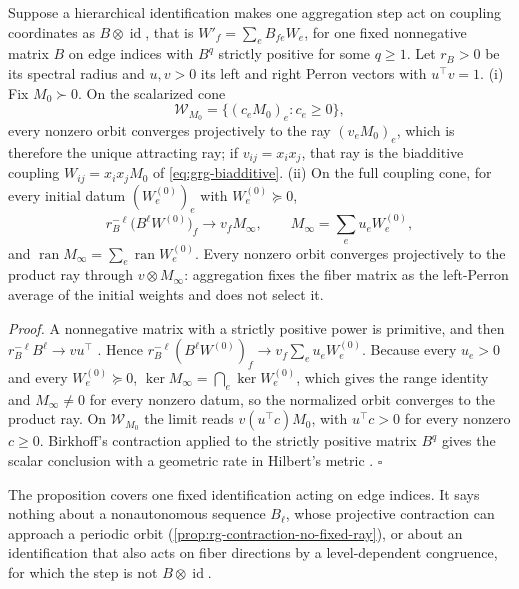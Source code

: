 Suppose a hierarchical identification makes one aggregation step act on
coupling coordinates as \(B\otimes\operatorname{id}\), that is
\(W'_f=\sum_eB_{fe}W_e\), for one fixed nonnegative matrix \(B\) on edge indices
with \(B^q\) strictly positive for some \(q\geq1\). Let \(r_B>0\) be its spectral
radius and \(u,v>0\) its left and right Perron vectors with \(u^\top v=1\).
(i) Fix \(M_0\succ0\). On the scalarized cone
\begin{equation}
\mathcal W_{M_0}=\{(c_eM_0)_e:c_e\geq0\},
\label{eq:grg-scalarized-cone}
\end{equation}
every nonzero orbit converges projectively to the ray \((v_eM_0)_e\), which is
therefore the unique attracting ray; if \(v_{ij}=x_ix_j\), that ray is the
biadditive coupling \(W_{ij}=x_ix_jM_0\) of \eqref{eq:grg-biadditive}.
(ii) On the full coupling cone, for every initial datum \((W_e^{(0)})_e\) with
\(W_e^{(0)}\succeq0\),
\begin{equation}
r_B^{-\ell}\bigl(B^\ell W^{(0)}\bigr)_f\longrightarrow v_fM_\infty,
\qquad
M_\infty=\sum_eu_eW_e^{(0)},
\label{eq:grg-full-cone-perron-limit}
\end{equation}
and \(\operatorname{ran}M_\infty=\sum_e\operatorname{ran}W_e^{(0)}\). Every
nonzero orbit converges projectively to the product ray through
\(v\otimes M_\infty\): aggregation fixes the fiber matrix as the left-Perron
average of the initial weights and does not select it. 

\noindent\emph{Proof.}
A nonnegative matrix with a strictly positive power is primitive, and then
\(r_B^{-\ell}B^\ell\to vu^\top\) \citep[\S8.5]{HornJohnson2013}. Hence
\(r_B^{-\ell}(B^\ell W^{(0)})_f\to v_f\sum_eu_eW_e^{(0)}\). Because every
\(u_e>0\) and every \(W_e^{(0)}\succeq0\),
\(\ker M_\infty=\bigcap_e\ker W_e^{(0)}\), which gives the range identity and
\(M_\infty\neq0\) for every nonzero datum, so the normalized orbit converges to
the product ray. On \(\mathcal W_{M_0}\) the limit reads \(v(u^\top c)M_0\), with
\(u^\top c>0\) for every nonzero \(c\geq0\). Birkhoff's contraction applied to the
strictly positive matrix \(B^q\) gives the scalar conclusion with a geometric
rate in Hilbert's metric \citep{Birkhoff1957}. \(\square\)

The proposition covers one fixed identification acting on edge indices. It
says nothing about a nonautonomous sequence \(B_\ell\), whose projective
contraction can approach a periodic orbit
(\cref{prop:rg-contraction-no-fixed-ray}), or about an identification that
also acts on fiber directions by a level-dependent congruence, for which the
step is not \(B\otimes\operatorname{id}\).

